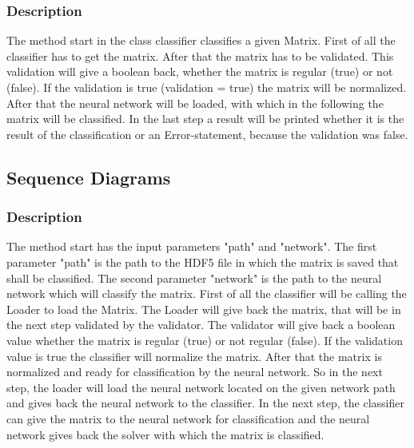 \documentclass[parskip=full]{scrartcl}
\begin{document}
\newpage
\subsubsection{Description}
The method start in the class classifier classifies a given Matrix.
First of all the classifier has to get the matrix. 
After that the matrix has to be validated.
This validation will give a boolean back, whether the matrix is regular (true) or not (false).
If the validation is true (validation = true) the matrix will be normalized.
After that the neural network will be loaded, with which in the following the matrix will be classified.
In the last step a result will be printed whether it is the result of the classification or an Error-statement, because the validation was false.

 
\newpage
\subsection{Sequence Diagrams} 

\begin{figure}[h]
\begin{center}

\label{Sequence Diagrams}
\end{center}
\end{figure}

\newpage
\subsubsection{Description}
The method start has the input parameters "path" and "network".
The first parameter "path" is the path to the HDF5 file in which the matrix is saved that shall be classified.
The second parameter "network" is the path to the neural network which will classify the matrix.
First of all the classifier will be calling the Loader to load the Matrix.
The Loader will give back the matrix, that will be in the next step validated by the validator. 
The validator will give back a boolean value whether the matrix is regular (true) or not regular (false).
If the validation value is true the classifier will normalize the matrix. 
After that the matrix is normalized and ready for classification by the neural network.
So in the next step, the loader will load the neural network located on the given network path and gives back the neural network to the classifier.
In the next step, the classifier can give the matrix to the neural network for classification and the neural network gives back the  solver with which the matrix is classified.
\end{document}

